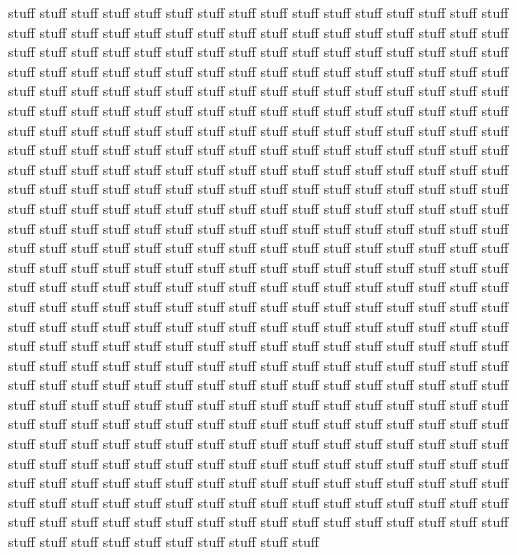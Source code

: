 \documentclass[proposal]{bsu-ms}
\begin{document}
stuff stuff stuff stuff stuff stuff stuff stuff stuff stuff stuff stuff stuff
stuff stuff stuff stuff stuff stuff stuff stuff stuff stuff stuff stuff stuff
stuff stuff stuff stuff stuff stuff stuff stuff stuff stuff stuff stuff stuff
stuff stuff stuff stuff stuff stuff stuff stuff stuff stuff stuff stuff stuff
stuff stuff stuff stuff stuff stuff stuff stuff stuff stuff stuff stuff stuff
stuff stuff stuff stuff stuff stuff stuff stuff stuff stuff stuff stuff stuff
stuff stuff stuff stuff stuff stuff stuff stuff stuff stuff stuff stuff stuff
stuff stuff stuff stuff stuff stuff stuff stuff stuff stuff stuff stuff stuff
stuff stuff stuff stuff stuff stuff stuff stuff stuff stuff stuff stuff stuff
stuff stuff stuff stuff stuff stuff stuff stuff stuff stuff stuff stuff stuff
stuff stuff stuff stuff stuff stuff stuff stuff stuff stuff stuff stuff stuff
stuff stuff stuff stuff stuff stuff stuff stuff stuff stuff stuff stuff stuff
stuff stuff stuff stuff stuff stuff stuff stuff stuff stuff stuff stuff stuff
stuff stuff stuff stuff stuff stuff stuff stuff stuff stuff stuff stuff stuff
stuff stuff stuff stuff stuff stuff stuff stuff stuff stuff stuff stuff stuff
stuff stuff stuff stuff stuff stuff stuff stuff stuff stuff stuff stuff stuff
stuff stuff stuff stuff stuff stuff stuff stuff stuff stuff stuff stuff stuff
stuff stuff stuff stuff stuff stuff stuff stuff stuff stuff stuff stuff stuff
stuff stuff stuff stuff stuff stuff stuff stuff stuff stuff stuff stuff stuff
stuff stuff stuff stuff stuff stuff stuff stuff stuff stuff stuff stuff stuff
stuff stuff stuff stuff stuff stuff stuff stuff stuff stuff stuff stuff stuff
stuff stuff stuff stuff stuff stuff stuff stuff stuff stuff stuff stuff stuff
stuff stuff stuff stuff stuff stuff stuff stuff stuff stuff stuff stuff stuff
stuff stuff stuff stuff stuff stuff stuff stuff stuff stuff stuff stuff stuff
stuff stuff stuff stuff stuff stuff stuff stuff stuff stuff stuff stuff stuff
stuff stuff stuff stuff stuff stuff stuff stuff stuff stuff stuff stuff stuff
stuff stuff stuff stuff stuff stuff stuff stuff stuff stuff stuff stuff stuff
stuff stuff stuff stuff stuff stuff stuff stuff stuff stuff stuff stuff stuff
stuff stuff stuff stuff stuff stuff stuff stuff stuff stuff stuff stuff stuff
stuff stuff stuff stuff stuff stuff stuff stuff stuff stuff stuff stuff stuff
stuff stuff stuff stuff stuff stuff stuff stuff stuff stuff stuff stuff stuff
stuff stuff stuff stuff stuff stuff stuff stuff stuff stuff stuff stuff stuff
stuff stuff stuff stuff stuff stuff stuff stuff stuff stuff stuff stuff stuff
stuff stuff stuff stuff stuff stuff stuff stuff stuff stuff stuff stuff stuff
\end{document}
